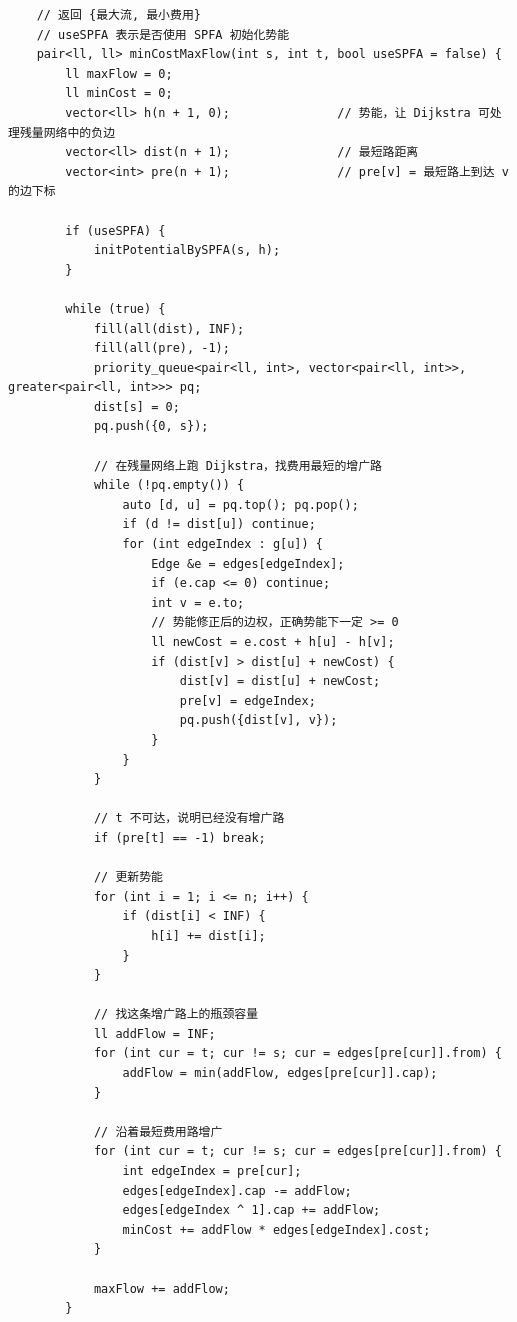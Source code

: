 \begin{verbatim}
    // 返回 {最大流, 最小费用}
    // useSPFA 表示是否使用 SPFA 初始化势能
    pair<ll, ll> minCostMaxFlow(int s, int t, bool useSPFA = false) {
        ll maxFlow = 0;
        ll minCost = 0;
        vector<ll> h(n + 1, 0);               // 势能，让 Dijkstra 可处理残量网络中的负边
        vector<ll> dist(n + 1);               // 最短路距离
        vector<int> pre(n + 1);               // pre[v] = 最短路上到达 v 的边下标

        if (useSPFA) {
            initPotentialBySPFA(s, h);
        }

        while (true) {
            fill(all(dist), INF);
            fill(all(pre), -1);
            priority_queue<pair<ll, int>, vector<pair<ll, int>>, greater<pair<ll, int>>> pq;
            dist[s] = 0;
            pq.push({0, s});

            // 在残量网络上跑 Dijkstra，找费用最短的增广路
            while (!pq.empty()) {
                auto [d, u] = pq.top(); pq.pop();
                if (d != dist[u]) continue;
                for (int edgeIndex : g[u]) {
                    Edge &e = edges[edgeIndex];
                    if (e.cap <= 0) continue;
                    int v = e.to;
                    // 势能修正后的边权，正确势能下一定 >= 0
                    ll newCost = e.cost + h[u] - h[v];
                    if (dist[v] > dist[u] + newCost) {
                        dist[v] = dist[u] + newCost;
                        pre[v] = edgeIndex;
                        pq.push({dist[v], v});
                    }
                }
            }

            // t 不可达，说明已经没有增广路
            if (pre[t] == -1) break;

            // 更新势能
            for (int i = 1; i <= n; i++) {
                if (dist[i] < INF) {
                    h[i] += dist[i];
                }
            }

            // 找这条增广路上的瓶颈容量
            ll addFlow = INF;
            for (int cur = t; cur != s; cur = edges[pre[cur]].from) {
                addFlow = min(addFlow, edges[pre[cur]].cap);
            }

            // 沿着最短费用路增广
            for (int cur = t; cur != s; cur = edges[pre[cur]].from) {
                int edgeIndex = pre[cur];
                edges[edgeIndex].cap -= addFlow;
                edges[edgeIndex ^ 1].cap += addFlow;
                minCost += addFlow * edges[edgeIndex].cost;
            }

            maxFlow += addFlow;
        }


\end{verbatim}
